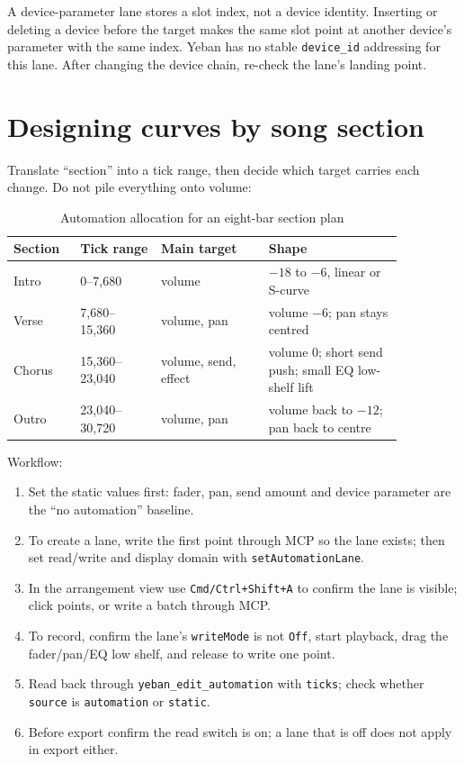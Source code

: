 
A device-parameter lane stores a slot index, not a device identity. Inserting or deleting a device before the target makes the same slot point at another device's parameter with the same index. Yeban has no stable \texttt{device\_id} addressing for this lane. After changing the device chain, re-check the lane's landing point.

\section{Designing curves by song section}

Translate ``section'' into a tick range, then decide which target carries each change. Do not pile everything onto volume:

\begin{table}[htbp]
\centering
\small
\begin{tabular}{@{}p{0.14\linewidth}p{0.18\linewidth}p{0.24\linewidth}p{0.30\linewidth}@{}}
\hline
Section & Tick range & Main target & Shape \\
\hline
Intro & 0--7{,}680 & volume & $-18$ to $-6$, linear or S-curve \\
Verse & 7{,}680--15{,}360 & volume, pan & volume $-6$; pan stays centred \\
Chorus & 15{,}360--23{,}040 & volume, send, effect & volume 0; short send push; small EQ low-shelf lift \\
Outro & 23{,}040--30{,}720 & volume, pan & volume back to $-12$; pan back to centre \\
\hline
\end{tabular}
\caption{Automation allocation for an eight-bar section plan}
\label{tab:automation-section-plan}
\end{table}

Workflow:

\begin{enumerate}
  \item Set the static values first: fader, pan, send amount and device parameter are the ``no automation'' baseline.
  \item To create a lane, write the first point through MCP so the lane exists; then set read/write and display domain with \texttt{set\allowbreak Automation\allowbreak Lane}.
  \item In the arrangement view use \texttt{Cmd/\allowbreak Ctrl+Shift+A} to confirm the lane is visible; click points, or write a batch through MCP.
  \item To record, confirm the lane's \texttt{writeMode} is not \texttt{Off}, start playback, drag the fader/pan/EQ low shelf, and release to write one point.
  \item Read back through \texttt{yeban\_edit\_automation} with \texttt{ticks}; check whether \texttt{source} is \texttt{automation} or \texttt{static}.
  \item Before export confirm the read switch is on; a lane that is off does not apply in export either.
\end{enumerate}


